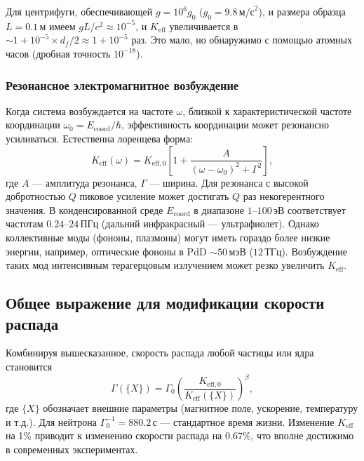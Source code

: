 \documentclass[12pt]{article}
\theoremstyle{remark}
\newcommand{\Keff}{K_{\mathrm{eff}}}
\newcommand{\Keffzero}{K_{\mathrm{eff},0}}
\newcommand{\df}{d_{\!f}}
\begin{document}
	Для центрифуги, обеспечивающей \(g = 10^6g_0\) (\(g_0 = 9.8\,\text{м/с}^2\)), и размера образца \(L = 0.1\,\text{м}\) имеем \(gL/c^2 \approx 10^{-5}\), и \(\Keff\) увеличивается в \(\sim 1 + 10^{-5}\times\df/2 \approx 1 + 10^{-5}\) раз. Это мало, но обнаружимо с помощью атомных часов (дробная точность \(10^{-18}\)).
	
	\subsubsection{Резонансное электромагнитное возбуждение}
	
	Когда система возбуждается на частоте \(\omega\), близкой к характеристической частоте координации \(\omega_0 = E_{\mathrm{coord}}/\hbar\), эффективность координации может резонансно усиливаться. Естественна лоренцева форма:
	\begin{equation}
		\Keff(\omega) = \Keffzero \left[ 1 + \frac{A}{(\omega - \omega_0)^2 + \Gamma^2} \right],
		\label{eq:keff-omega}
	\end{equation}
	где \(A\) — амплитуда резонанса, \(\Gamma\) — ширина. Для резонанса с высокой добротностью \(Q\) пиковое усиление может достигать \(Q\) раз некогерентного значения. В конденсированной среде \(E_{\mathrm{coord}}\) в диапазоне \(1\)–\(100\,\text{эВ}\) соответствует частотам \(0.24\)–\(24\,\text{ПГц}\) (дальний инфракрасный — ультрафиолет). Однако коллективные моды (фононы, плазмоны) могут иметь гораздо более низкие энергии, например, оптические фононы в PdD \(\sim 50\,\text{мэВ}\) (\(12\,\text{ТГц}\)). Возбуждение таких мод интенсивным терагерцовым излучением может резко увеличить \(\Keff\).
	
	\subsection{Общее выражение для модификации скорости распада}
	
	Комбинируя вышесказанное, скорость распада любой частицы или ядра становится
	\begin{equation}
		\Gamma(\{X\}) = \Gamma_0 \left( \frac{\Keffzero}{\Keff(\{X\})} \right)^{\beta},
		\label{eq:general-rate}
	\end{equation}
	где \(\{X\}\) обозначает внешние параметры (магнитное поле, ускорение, температуру и т.д.). Для нейтрона \(\Gamma_0^{-1} = 880.2\,\text{с}\) — стандартное время жизни. Изменение \(\Keff\) на 1\% приводит к изменению скорости распада на 0.67\%, что вполне достижимо в современных экспериментах.
	
\end{document}
